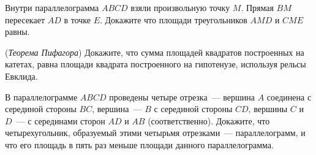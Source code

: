 \begin{problems}
\item
Внутри параллелограмма $ABCD$ взяли произвольную точку $M$. Прямая $BM$ пересекает $AD$ в точке $E$. Докажите что площади треугольников $AMD$ и $CME$ равны.


\item (\textit{Теорема Пифагора})
Докажите, что сумма площадей квадратов построенных на катетах, равна площади квадрата построенного на гипотенузе, используя рельсы Евклида.

\item В параллелограмме $ABCD$ проведены четыре отрезка~--- вершина $A$ соединена с серединой стороны $BC$, вершина~--- $B$ с серединой стороны $CD$, вершины $C$ и $D$~--- с серединами сторон $AD$ и $AB$ (соответственно). Докажите, что четырехугольник, образуемый этими четырьмя отрезками~--- параллелограмм, и что его площадь в пять раз меньше площади данного параллелограмма.
\end{problems}

